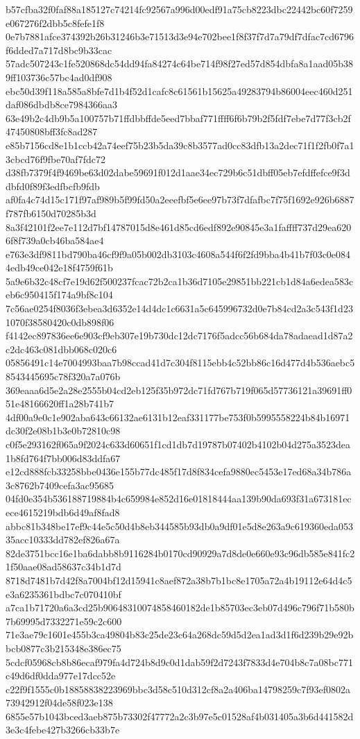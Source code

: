 {b57cfba32f0faf88a185127c74214fc92567a996d00edf91a75cb8223dbc22442bc60f7259e067276f2dbb5c8fefe1f8
0e7b7881afce374392b26b31246b3e71513d3e94e702bee1f8f37f7d7a79df7dfac7cd6796f6dded7a717d8bc9b33cac
57adc507243c1fe520868dc54dd94fa84274c64be714f98f27ed57d854dbfa8a1aad05b389ff103736c57bc4ad0df908
ebc50d39f118a585a8bfe7d1b4f52d1cafc8c61561b15625a49283794b86004eec460d251daf086dbdb8ce7984366aa3
63e49b2c4db9b5a100757b71ffdbbffde5eed7bbaf771ffff6f6b79b2f5fdf7ebe7d77f3cb2f47450808bff3fc8ad287
e85b7156cd8e1b1ccb42a74eef75b23b5da39c8b3577ad0cc83dfb13a2dec71f1f2fb0f7a13cbcd76f9fbe70af7fdc72
d38fb7379f4f9469be63d02dabe59691f012d1aae34ec729b6c51dbff05eb7efdffefce9f3ddbfd0f89f3edfbcfb9fdb
af0fa4c74d15c171f97af989b5f99fd50a2eeefbf5e6ee97b73f7dfafbc7f75f1692e926b6887f787fb6150d70285b3d
8a3f42101f2ee7e112d7bf14787015d8e461d85cd6edf892e90845e3a1faffff737d29ea6206f8f739a0cb46ba584ae4
e763e3df9811bd790ba46cf9f9a05b002db3103c4608a544f6f2fd9bba4b41b7f03c0e0844edb49ce042e18f4759f61b
5a9e6b32c48cf7e19d62f500237fcac72b2ca1b36d7105e29851bb221cb1d84a6edea583ceb6c950415f174a9bf8c104
7c56ae0254f8036f3ebea3d6352e14d4dc1c6631a5c645996732d0e7b84cd2a3c543f1d231070f38580420c0db898f06
f4142ec897836ee6e903cf9eb307e19b730dc12dc7176f5adcc56b684da78adaead1d87a2c2dc463c081dbb068c020c6
05856491c14e7004993baa7b98ccad41d7c304f8115ebb4c52bb86c16d477d4b536aebc58543445695c78f320a7a076b
369eaaa6d5e2a28e2555b04cd2eb125f35b972dc71fd767b719f065d57736121a39691ff051e48166620ff1a28b741b7
4df00a9e0c1e902aba643c66132ae6131b12eaf331177be753f0b5995558224b84b16971dc30f2e08b1b3e0b72810c98
c0f5e293162f065a9f2024c633d60651f1cd1db7d19787b07402b4102b04d275a3523dea1b8fd764f7bb006d83ddfa67
e12cd888fcb33258bbe0436e155b77dc485f17d8f834cefa9880ec5453e17ed68a34b786a3c8762b7409cefa3ac95685
04fd0e354b536188719884b4c659984e852d16e01818444aa139b90da693f31a673181ecece4615219bdb6d49af8fad8
abbc81b348be17ef9c44e5c50d4b8eb344585b93db0a9df01e5d8e263a9c619360eda05335acc10333dd782ef826a67a
82de3751bcc16e1ba6dabb8b9116284b0170cd90929a7d8de0e660e93c96db585e841fc21f50aae08ad58637c34b1d7d
8718d7481b7d42f8a7004bf12d15941c8aef872a38b7b1bc8e1705a72a4b19112e64d4c5e3a6235361bdbc7c070410bf
a7ca1b71720a6a3cd25b90648310074858460182de1b85703ec3eb07d496c796f71b580b7b69995d7332271e59c2c600
71e3ae79c1601e455b3ca49804b83c25de23c64a268dc59d5d2ea1ad3d1f6d239b29e92bbcb0877c3b215348e386ec75
5cdcf05968cb8b86ecaf979fa4d724b8d9c0d1dab59f2d7243f7833d4e704b8c7a08bc771c49d6df0dda977e17dcc52e
c22f9f1555c0b18858838223969bbc3d58c510d312cf8a2a406ba14798259c7f93ef0802a73942912f04de58f023e138
6855e57b1043bced3aeb875b73302f47772a2c3b97e5c01528af4b031405a3b6d441582d3e3c4febe427b3266cb33b7e
}
